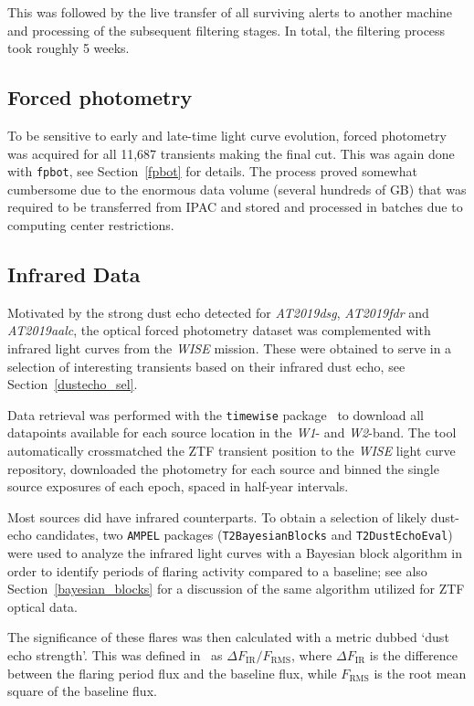 This was followed by the live transfer of all surviving alerts to another machine and processing of the subsequent filtering stages. In total, the filtering process took roughly 5 weeks.

\subsection{Forced photometry}
To be sensitive to early and late-time light curve evolution, forced photometry was acquired for all 11,687 transients making the final cut. This was again done with \texttt{fpbot}, see Section~\ref{fpbot} for details. The process proved somewhat cumbersome due to the enormous data volume (several hundreds of GB) that was required to be transferred from IPAC and stored and processed in batches due to computing center restrictions.

\subsection{Infrared Data}\label{irdata}
Motivated by the strong dust echo detected for \textit{AT2019dsg}, \textit{AT2019fdr} and \textit{AT2019aalc}, the optical forced photometry dataset was complemented with infrared light curves from the \textit{WISE} mission. These were obtained to serve in a selection of interesting transients based on their infrared dust echo, see Section~\ref{dustecho_sel}.

Data retrieval was performed with the \texttt{timewise} package~ to download all datapoints available for each source location in the \textit{W1}- and \textit{W2}-band. The tool automatically crossmatched the ZTF transient position to the \textit{WISE} light curve repository, downloaded the photometry for each source and binned the single source exposures of each epoch, spaced in half-year intervals.

Most sources did have infrared counterparts. To obtain a selection of likely dust-echo candidates, two \texttt{AMPEL} packages (\texttt{T2BayesianBlocks} and \texttt{T2DustEchoEval}) were used to analyze the infrared light curves with a Bayesian block algorithm in order to identify periods of flaring activity compared to a baseline; see also Section~\ref{bayesian_blocks} for a discussion of the same algorithm utilized for ZTF optical data.

The significance of these flares was then calculated with a metric dubbed `dust echo strength'. This was defined in~\cite{Velzen2021} as $\Delta F_\text{IR}/F_\text{RMS}$, where $\Delta F_\text{IR}$ is the difference between the flaring period flux and the baseline flux, while $F_\text{RMS}$ is the root mean square of the baseline flux.

